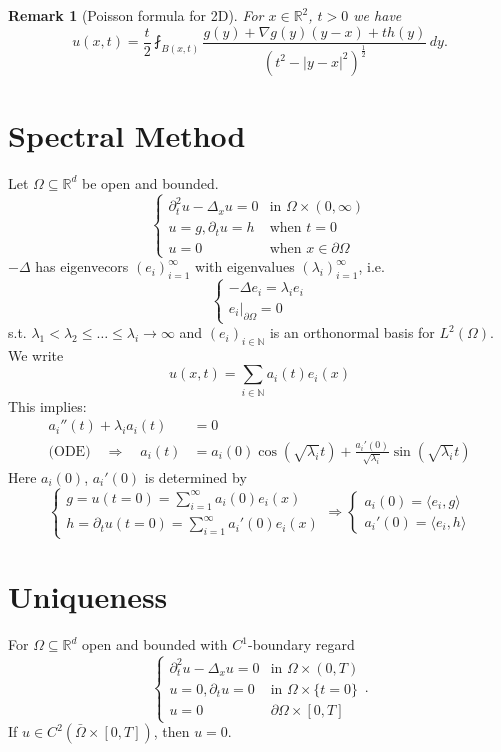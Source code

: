 \documentclass{report}
\theoremstyle{tommy}
\newtheorem{rem}[defn]{Remark}
\begin{document}
  \begin{rem}[Poisson formula for 2D]
    For \(x \in \mathbb{R}^2\), \(t>0\) we have
    \[u(x,t) = \frac{t}{2} \fint_{B(x,t)} \frac{g(y) + \nabla g(y)(y-x) + th(y)}{(t^2 - |y-x|^2)^{\frac{1}{2}}} \, dy.\]
  \end{rem}

  \section{Spectral Method}
  Let \(\Omega \subseteq \mathbb{R}^d\) be open and bounded.
  \[\begin{cases}
    \partial_t^2 u - \Delta_x u = 0 &\text{in }  \Omega \times (0,\infty) \\
    u = g, \partial_t u = h &\text{when } t = 0 \\
    u = 0 &\text{when } x \in \partial \Omega
  \end{cases}\]
  \(-\Delta\) has eigenvecors \((e_i)_{i=1}^\infty\) with eigenvalues \((\lambda_i)_{i=1}^\infty\), i.e.
  \[\begin{cases}
    -\Delta e_i = \lambda_i e_i \\ e_i|_{\partial \Omega} = 0
  \end{cases}\]
  s.t. \(\lambda_1 < \lambda_2 \le \dots \le \lambda_i \to \infty\) and \((e_i)_{i \in \mathbb{N}}\) is an orthonormal basis for \(L^2(\Omega)\).
  We write 
  \[u(x,t) = \sum_{i \in \mathbb{N}} a_i(t) e_i(x)\]
  This implies:
  \begin{align*}
    a_i''(t) + \lambda_i a_i(t) &= 0 \\
    \text{(ODE)} \quad \Rightarrow \quad a_i(t) &= a_i(0) \cos(\sqrt{\lambda_i}t) + \frac{a_i'(0)}{\sqrt{\lambda_i}} \sin(\sqrt{\lambda_i}t)
  \end{align*}
  Here \(a_i(0)\), \(a_i'(0)\) is determined by 
  \[\begin{cases}
    g = u(t=0) = \sum_{i=1}^\infty a_i(0) e_i(x) \\
    h=\partial_t u(t=0) = \sum_{i=1}^\infty a_i'(0) e_i(x)
  \end{cases}
  \Rightarrow \begin{cases}
    a_i(0) = \langle e_i, g \rangle \\ a_i'(0) = \langle e_i, h\rangle
  \end{cases}\]

  \section{Uniqueness}
  For \(\Omega \subseteq \mathbb{R}^d\) open and bounded with \(C^1\)-boundary regard
  \[\begin{cases}
    \partial_t^2 u - \Delta_x u = 0 &\text{in } \Omega \times (0,T) \\
    u = 0, \partial_t u = 0 &\text{in } \Omega \times \{t=0\} \\
    u=0 &\partial \Omega \times [0,T]
  \end{cases}.\]
  If \(u \in C^2(\bar \Omega \times [0,T])\), then \(u = 0\).
\end{document}
